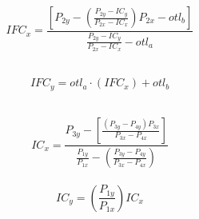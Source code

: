 \documentclass[14pt,a4paper]{report}  %
\newcommand{\fourteen}{\fontsize{14pt}{\baselineskip}\selectfont}%
\begin{document}
{      \fourteen {其中}
      \begin{equation}
      IFC_{x} = \frac{\left[ P_{2y} - \left( \frac{P_{2y} - IC_{y}}{P_{2x} - IC_{x}} \right )P_{2x} - otl_{b} \right ]}{\frac{P_{2y} - IC_{y}}{P_{2x} - IC_{x}}-otl_{a}}
      \end{equation}
      \hspace*{\fill} \\
      

      \begin{flushleft}
      \begin{equation}
      IFC_{y} = otl_{a} \cdot \left( IFC_{x} \right ) + otl_{b}
      \end{equation}
      \end{flushleft}
      \hspace*{\fill} \\
      
      \begin{equation}
      IC_{x} = \frac{P_{3y} - \left [ \frac {(P_{3y} - P_{4y})P_{3x}}{P_{3x}-P_{4x}} \right ]}{\frac{P_{1y}}{P_{1x}}-\left ( \frac{P_{3y} - P_{4y}}{P_{3x}-P_{4x}} \right )}
      \end{equation}
      \hspace*{\fill} \\
      
      \begin{equation}
      IC_{y} = \left ( \frac{P_{1y}}{P_{1x}} \right ) IC_{x}
      \end{equation}
      \hspace*{\fill} \\
      
}
\end{document}
